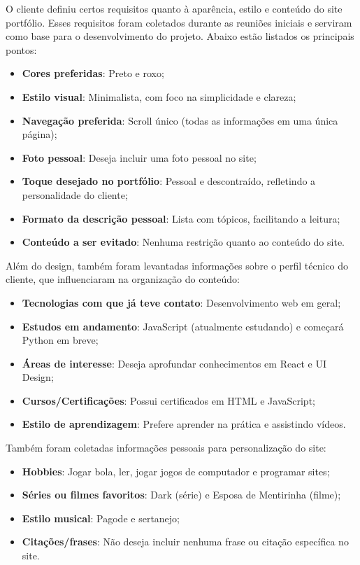 O cliente definiu certos requisitos quanto à aparência, estilo e conteúdo do site portfólio. Esses requisitos foram coletados durante as reuniões iniciais e serviram como base para o desenvolvimento do projeto. Abaixo estão listados os principais pontos:

\begin{itemize}
    \item \textbf{Cores preferidas}: Preto e roxo;
    \item \textbf{Estilo visual}: Minimalista, com foco na simplicidade e clareza;
    \item \textbf{Navegação preferida}: Scroll único (todas as informações em uma única página);
    \item \textbf{Foto pessoal}: Deseja incluir uma foto pessoal no site;
    \item \textbf{Toque desejado no portfólio}: Pessoal e descontraído, refletindo a personalidade do cliente;
    \item \textbf{Formato da descrição pessoal}: Lista com tópicos, facilitando a leitura;
    \item \textbf{Conteúdo a ser evitado}: Nenhuma restrição quanto ao conteúdo do site.
\end{itemize}

Além do design, também foram levantadas informações sobre o perfil técnico do cliente, que influenciaram na organização do conteúdo:

\begin{itemize}
    \item \textbf{Tecnologias com que já teve contato}: Desenvolvimento web em geral;
    \item \textbf{Estudos em andamento}: JavaScript (atualmente estudando) e começará Python em breve;
    \item \textbf{Áreas de interesse}: Deseja aprofundar conhecimentos em React e UI Design;
    \item \textbf{Cursos/Certificações}: Possui certificados em HTML e JavaScript;
    \item \textbf{Estilo de aprendizagem}: Prefere aprender na prática e assistindo vídeos.
\end{itemize}

Também foram coletadas informações pessoais para personalização do site:

\begin{itemize}
    \item \textbf{Hobbies}: Jogar bola, ler, jogar jogos de computador e programar sites;
    \item \textbf{Séries ou filmes favoritos}: Dark (série) e Esposa de Mentirinha (filme);
    \item \textbf{Estilo musical}: Pagode e sertanejo;
    \item \textbf{Citações/frases}: Não deseja incluir nenhuma frase ou citação específica no site.
\end{itemize}

